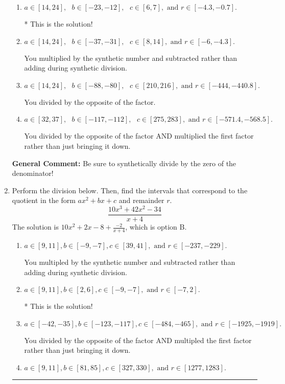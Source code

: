 \documentclass{extbook}[14pt]
\newcommand{\litem}[1]{\item #1

\rule{\textwidth}{0.4pt}}
\begin{document}
\begin{enumerate}
{\begin{enumerate}[label=\Alph*.]
 You multiplied by the synthetic number rather than bringing the first factor down.
\item \( a \in [14, 24], \text{   } b \in [-23, -12], \text{   } c \in [6, 7], \text{   and   } r \in [-4.3, -0.7]. \)

* This is the solution!
\item \( a \in [14, 24], \text{   } b \in [-37, -31], \text{   } c \in [8, 14], \text{   and   } r \in [-6, -4.3]. \)

 You multiplied by the synthetic number and subtracted rather than adding during synthetic division.
\item \( a \in [14, 24], \text{   } b \in [-88, -80], \text{   } c \in [210, 216], \text{   and   } r \in [-444, -440.8]. \)

 You divided by the opposite of the factor.
\item \( a \in [32, 37], \text{   } b \in [-117, -112], \text{   } c \in [275, 283], \text{   and   } r \in [-571.4, -568.5]. \)

 You divided by the opposite of the factor AND multiplied the first factor rather than just bringing it down.
\end{enumerate}

\textbf{General Comment:} Be sure to synthetically divide by the zero of the denominator!
}
\litem{
Perform the division below. Then, find the intervals that correspond to the quotient in the form $ax^2+bx+c$ and remainder $r$.
\[ \frac{10x^{3} +42 x^{2} -34}{x + 4} \]The solution is \( 10x^{2} +2 x -8 + \frac{-2}{x + 4} \), which is option B.\begin{enumerate}[label=\Alph*.]
\item \( a \in [9, 11], b \in [-9, -7], c \in [39, 41], \text{ and } r \in [-237, -229]. \)

 You multipled by the synthetic number and subtracted rather than adding during synthetic division.
\item \( a \in [9, 11], b \in [2, 6], c \in [-9, -7], \text{ and } r \in [-7, 2]. \)

* This is the solution!
\item \( a \in [-42, -35], b \in [-123, -117], c \in [-484, -465], \text{ and } r \in [-1925, -1919]. \)

 You divided by the opposite of the factor AND multipled the first factor rather than just bringing it down.
\item \( a \in [9, 11], b \in [81, 85], c \in [327, 330], \text{ and } r \in [1277, 1283]. \)


\end{enumerate}}
\end{enumerate}
\end{document}
